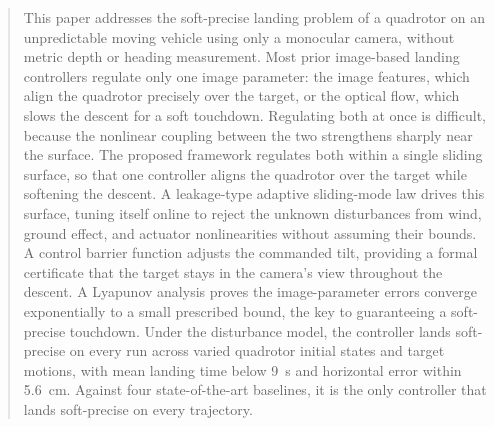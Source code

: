 \documentclass{IEEEtaes}
\begin{document}
\begin{abstract}This paper addresses the soft-precise landing problem of a quadrotor on an unpredictable moving vehicle using only a monocular camera, without metric depth or heading measurement. Most prior image-based landing controllers regulate only one image parameter: the image features, which align the quadrotor precisely over the target, or the optical flow, which slows the descent for a soft touchdown. Regulating both at once is difficult, because the nonlinear coupling between the two strengthens sharply near the surface. The proposed framework regulates both within a single sliding surface, so that one controller aligns the quadrotor over the target while softening the descent. A leakage-type adaptive sliding-mode law drives this surface, tuning itself online to reject the unknown disturbances from wind, ground effect, and actuator nonlinearities without assuming their bounds. A control barrier function adjusts the commanded tilt, providing a formal certificate that the target stays in the camera's view throughout the descent. A Lyapunov analysis proves the image-parameter errors converge exponentially to a small prescribed bound, the key to guaranteeing a soft-precise touchdown. Under the disturbance model, the controller lands soft-precise on every run across varied quadrotor initial states and target motions, with mean landing time below 9~s and horizontal error within 5.6~cm. Against four state-of-the-art baselines, it is the only controller that lands soft-precise on every trajectory.
\end{abstract}

\end{document}

